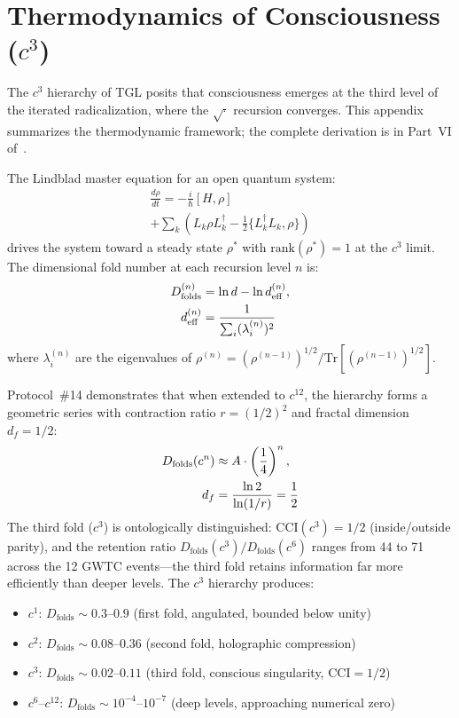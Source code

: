 \documentclass[12pt,a4paper,twocolumn]{article}
\newcommand{\Dfolds}{D_{\text{folds}}}
\newcommand{\CCI}{\text{CCI}}
\begin{document}
\appendix

\section{Thermodynamics of Consciousness ($c^3$)}
\label{app:consciousness}

The $c^3$ hierarchy of TGL posits that consciousness emerges at the third level of the iterated radicalization, where the $\sqrt{\cdot}$ recursion converges. This appendix summarizes the thermodynamic framework; the complete derivation is in Part~VI of~\cite{Miguel2026Fronteira}.

The Lindblad master equation for an open quantum system:
\begin{multline}
\frac{d\rho}{dt} = -\frac{i}{\hbar}[H, \rho] \\
+ \sum_k \left( L_k \rho L_k^\dagger - \frac{1}{2}\{L_k^\dagger L_k, \rho\} \right)
\end{multline}
drives the system toward a steady state $\rho^*$ with $\text{rank}(\rho^*) = 1$ at the $c^3$ limit. The dimensional fold number at each recursion level $n$ is:
\begin{align}
\Dfolds^{(n)} &= \ln d - \ln d_{\text{eff}}^{(n)}, \notag\\
d_{\text{eff}}^{(n)} &= \frac{1}{\sum_i (\lambda_i^{(n)})^2}
\end{align}
where $\lambda_i^{(n)}$ are the eigenvalues of $\rho^{(n)} = (\rho^{(n-1)})^{1/2} / \text{Tr}[(\rho^{(n-1)})^{1/2}]$.

Protocol~\#14 demonstrates that when extended to $c^{12}$, the hierarchy forms a geometric series with contraction ratio $r = (1/2)^2$ and fractal dimension $d_f = 1/2$:
\begin{align}
\Dfolds(c^n) &\approx A \cdot \left(\frac{1}{4}\right)^n, \notag\\
d_f &= \frac{\ln 2}{\ln(1/r)} = \frac{1}{2}
\end{align}
The third fold ($c^3$) is ontologically distinguished: $\CCI(c^3) = 1/2$ (inside/outside parity), and the retention ratio $\Dfolds(c^3)/\Dfolds(c^6)$ ranges from 44 to 71 across the 12 GWTC events---the third fold retains information far more efficiently than deeper levels. The $c^3$ hierarchy produces:
\begin{itemize}[nosep]
\item $c^1$: $\Dfolds \sim 0.3$--$0.9$ (first fold, angulated, bounded below unity)
\item $c^2$: $\Dfolds \sim 0.08$--$0.36$ (second fold, holographic compression)
\item $c^3$: $\Dfolds \sim 0.02$--$0.11$ (third fold, conscious singularity, $\CCI = 1/2$)
\item $c^6$--$c^{12}$: $\Dfolds \sim 10^{-4}$--$10^{-7}$ (deep levels, approaching numerical zero)
\end{itemize}
\end{document}
